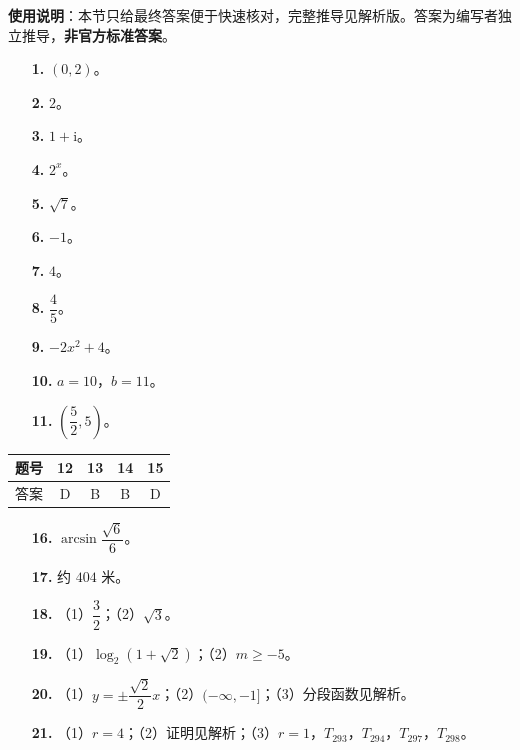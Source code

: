 
\begin{gknotice}
\textbf{使用说明}：本节只给最终答案便于快速核对，完整推导见解析版。答案为编写者独立推导，\textbf{非官方标准答案}。
\end{gknotice}

\begin{itemize}[leftmargin=2.6em]
  \item[\textbf{1.}] $(0,2)$。
  \item[\textbf{2.}] $2$。
  \item[\textbf{3.}] $1+\mathrm i$。
  \item[\textbf{4.}] $2^x$。
  \item[\textbf{5.}] $\sqrt7$。
  \item[\textbf{6.}] $-1$。
  \item[\textbf{7.}] $4$。
  \item[\textbf{8.}] $\dfrac45$。
  \item[\textbf{9.}] $-2x^2+4$。
  \item[\textbf{10.}] $a=10$，$b=11$。
  \item[\textbf{11.}] $\left(\dfrac52,5\right)$。
\end{itemize}

\begin{center}\begin{tabular}{ccccc}
\toprule
题号 & 12 & 13 & 14 & 15 \\
\midrule
答案 & D & B & B & D \\
\bottomrule
\end{tabular}\end{center}

\begin{itemize}[leftmargin=2.6em]
  \item[\textbf{16.}] $\arcsin\dfrac{\sqrt6}6$。
  \item[\textbf{17.}] 约 $404$ 米。
  \item[\textbf{18.}] （1）$\dfrac32$；（2）$\sqrt3$。
  \item[\textbf{19.}] （1）$\log_2(1+\sqrt2)$；（2）$m\geqslant-5$。
  \item[\textbf{20.}] （1）$y=\pm\dfrac{\sqrt2}2x$；（2）$(-\infty,-1]$；（3）分段函数见解析。
  \item[\textbf{21.}] （1）$r=4$；（2）证明见解析；（3）$r=1$，$T_{293}$，$T_{294}$，$T_{297}$，$T_{298}$。
\end{itemize}
